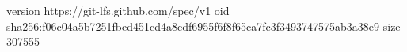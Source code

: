 version https://git-lfs.github.com/spec/v1
oid sha256:f06c04a5b7251fbed451cd4a8cdf6955f6f8f65ca7fc3f3493747575ab3a38e9
size 307555
